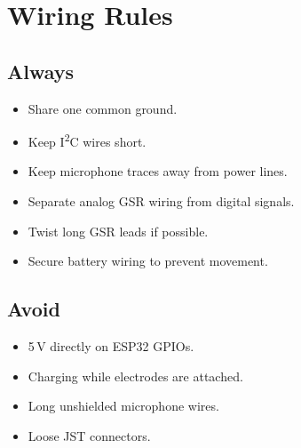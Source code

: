 \section{Wiring Rules}
\label{sec:wiring-rules}

\subsection{Always}
\label{sec:wiring-always}

\begin{itemize}
    \item Share one common ground.
    \item Keep I\textsuperscript{2}C wires short.
    \item Keep microphone traces away from power lines.
    \item Separate analog GSR wiring from digital signals.
    \item Twist long GSR leads if possible.
    \item Secure battery wiring to prevent movement.
\end{itemize}

\subsection{Avoid}
\label{sec:wiring-avoid}

\begin{warningbox}
\begin{itemize}
    \item 5\,V directly on ESP32 GPIOs.
    \item Charging while electrodes are attached.
    \item Long unshielded microphone wires.
    \item Loose JST connectors.
\end{itemize}
\end{warningbox}

